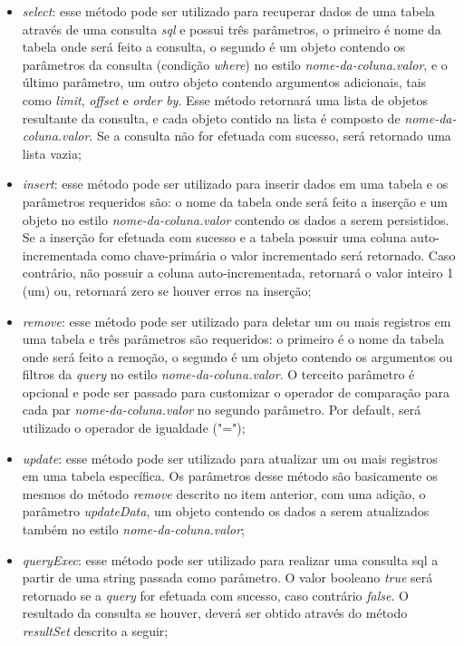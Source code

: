 \begin{itemize}
	\item \textit{select}: esse método pode ser utilizado para recuperar dados de uma tabela através de uma consulta \textit{sql} e possui três parâmetros, o primeiro é nome da tabela onde será feito a consulta, o segundo é um objeto contendo os parâmetros da consulta (condição \textit{where}) no estilo \textit{nome-da-coluna.valor}, e o último parâmetro, um outro objeto contendo argumentos adicionais, tais como \textit{limit}, \textit{offset} e \textit{order by}. Esse método retornará uma lista de objetos resultante da consulta, e cada objeto contido na lista é composto de \textit{nome-da-coluna.valor}. Se a consulta não for efetuada com sucesso, será retornado uma lista vazia;

	\item \textit{insert}: esse método pode ser utilizado para inserir dados em uma tabela e os parâmetros requeridos são: o nome da tabela onde será feito a inserção e um objeto no estilo \textit{nome-da-coluna.valor} contendo os dados a serem persistidos. Se a inserção for efetuada com sucesso e a tabela possuir uma coluna auto-incrementada como chave-primária o valor incrementado será retornado. Caso contrário, não possuir a coluna auto-incrementada, retornará o valor inteiro 1 (um) ou, retornará zero se houver erros na inserção;

	\item \textit{remove}: esse método pode ser utilizado para deletar um ou mais registros em uma tabela e três parâmetros são requeridos: o primeiro é o nome da tabela onde será feito a remoção, o segundo é um objeto contendo os argumentos ou filtros da \textit{query} no estilo \textit{nome-da-coluna.valor}. O terceito parâmetro é opcional e pode ser passado para customizar o operador de comparação para cada par \textit{nome-da-coluna.valor} no segundo parâmetro. Por default, será utilizado o operador de igualdade ("=");

	\item \textit{update}: esse método pode ser utilizado para atualizar um ou mais registros em uma tabela específica. Os parâmetros desse método são basicamente os mesmos do método \textit{remove} descrito no item anterior, com uma adição, o parâmetro \textit{updateData}, um objeto contendo os dados a serem atualizados também no estilo \textit{nome-da-coluna.valor};

	\item \textit{queryExec}: esse método pode ser utilizado para realizar uma consulta sql a partir de uma string passada como parâmetro. O valor booleano \textit{true} será retornado se a \textit{query} for efetuada com sucesso, caso contrário \textit{false}. O resultado da consulta se houver, deverá ser obtido através do método \textit{resultSet} descrito a seguir;


\end{itemize}
